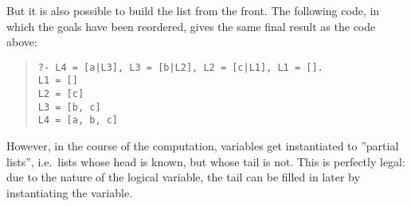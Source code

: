 But it is also possible to build the list from the front.
The following code, in which the goals have been reordered,
gives the same final result as the code above:
\begin{quote}\begin{verbatim}
?- L4 = [a|L3], L3 = [b|L2], L2 = [c|L1], L1 = [].
L1 = []
L2 = [c]
L3 = [b, c]
L4 = [a, b, c]
\end{verbatim}\end{quote}
However, in the course of the computation, variables get instantiated to
''partial lists'', i.e.\ lists whose head is known, but whose tail is not.
This is perfectly legal: due to the nature of the logical variable, the
tail can be filled in later by instantiating the variable.


%
%


